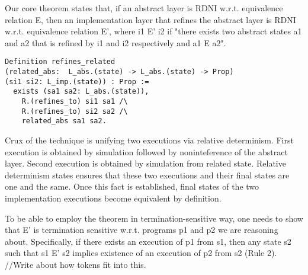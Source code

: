 Our core theorem states that, if an abstract layer is RDNI w.r.t. equivalence relation E, then an implementation layer that refines the abstract layer is RDNI w.r.t. equivalence relation E', where i1 E' i2 if "there exists two abstract states a1 and a2 that is refined by i1 and i2 respectively and a1 E a2".  

\begin{lstlisting}
Definition refines_related 
(related_abs:  L_abs.(state) -> L_abs.(state) -> Prop)
(si1 si2: L_imp.(state)) : Prop :=
  exists (sa1 sa2: L_abs.(state)),
    R.(refines_to) si1 sa1 /\
    R.(refines_to) si2 sa2 /\
    related_abs sa1 sa2.
\end{lstlisting}



Crux of the technique is unifying two executions via relative determinism. First execution is obtained by simulation followed by noninteference of the abstract layer. Second execution is obtained by simulation from related state. Relative determinism states ensures that these two executions and their final states are one and the same. Once this fact is established, final states of the two implementation executions become equivalent by definition.

To be able to employ the theorem in termination-sensitive way, one needs to show that E' is termination sensitive w.r.t. programs p1 and p2 we are reasoning about. Specifically, if there exists an execution of p1 from s1, then any state s2 such that s1 E' s2 implies existence of an execution of p2 from s2 (Rule 2). \\

//Write about how tokens fit into this.\\

